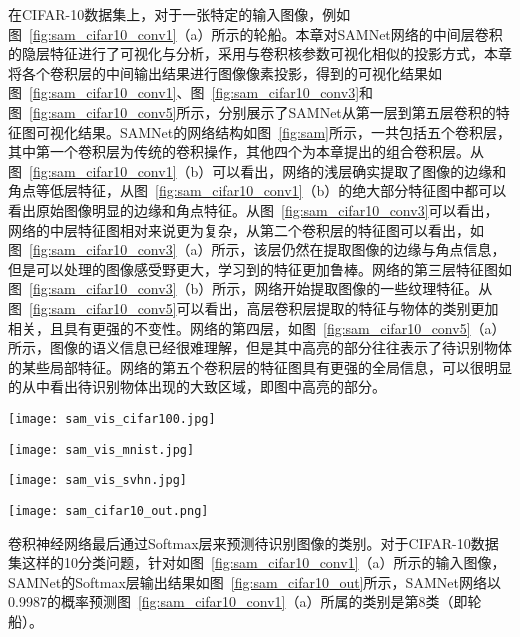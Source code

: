 在CIFAR-10数据集上，对于一张特定的输入图像，例如图~\ref{fig:sam_cifar10_conv1}（a）所示的轮船。本章对SAMNet网络的中间层卷积的隐层特征进行了可视化与分析，采用与卷积核参数可视化相似的投影方式，本章将各个卷积层的中间输出结果进行图像像素投影，得到的可视化结果如图~\ref{fig:sam_cifar10_conv1}、图~\ref{fig:sam_cifar10_conv3}和图~\ref{fig:sam_cifar10_conv5}所示，分别展示了SAMNet从第一层到第五层卷积的特征图可视化结果。SAMNet的网络结构如图~\ref{fig:sam}所示，一共包括五个卷积层，其中第一个卷积层为传统的卷积操作，其他四个为本章提出的组合卷积层。从图~\ref{fig:sam_cifar10_conv1}（b）可以看出，网络的浅层确实提取了图像的边缘和角点等低层特征，从图~\ref{fig:sam_cifar10_conv1}（b）的绝大部分特征图中都可以看出原始图像明显的边缘和角点特征。从图~\ref{fig:sam_cifar10_conv3}可以看出，网络的中层特征图相对来说更为复杂，从第二个卷积层的特征图可以看出，如图~\ref{fig:sam_cifar10_conv3}（a）所示，该层仍然在提取图像的边缘与角点信息，但是可以处理的图像感受野更大，学习到的特征更加鲁棒。网络的第三层特征图如图~\ref{fig:sam_cifar10_conv3}（b）所示，网络开始提取图像的一些纹理特征。从图~\ref{fig:sam_cifar10_conv5}可以看出，高层卷积层提取的特征与物体的类别更加相关，且具有更强的不变性。网络的第四层，如图~\ref{fig:sam_cifar10_conv5}（a）所示，图像的语义信息已经很难理解，但是其中高亮的部分往往表示了待识别物体的某些局部特征。网络的第五个卷积层的特征图具有更强的全局信息，可以很明显的从中看出待识别物体出现的大致区域，即图中高亮的部分。

\begin{figure*}
\centering
\texttt{[image: sam\_vis\_cifar100.jpg]}
\caption{CIFAR-100卷积层特征可视化。}
\label{fig:sam_vis_cifar100}
\end{figure*}

\begin{figure*}
\centering
\texttt{[image: sam\_vis\_mnist.jpg]}
\caption{MNIST卷积层特征可视化。}
\label{fig:sam_vis_mnist}
\end{figure*}

\begin{figure*}
\centering
\texttt{[image: sam\_vis\_svhn.jpg]}
\caption{SVHN卷积层特征可视化。}
\label{fig:sam_vis_svhn}
\end{figure*}


\begin{figure*}
\centering
\texttt{[image: sam\_cifar10\_out.png]}
\caption{Softmax层各类别预测概率输出。}
\label{fig:sam_cifar10_out}
\end{figure*}

卷积神经网络最后通过Softmax层来预测待识别图像的类别。对于CIFAR-10数据集这样的10分类问题，针对如图~\ref{fig:sam_cifar10_conv1}（a）所示的输入图像，SAMNet的Softmax层输出结果如图~\ref{fig:sam_cifar10_out}所示，SAMNet网络以0.9987的概率预测图~\ref{fig:sam_cifar10_conv1}（a）所属的类别是第8类（即轮船）。


